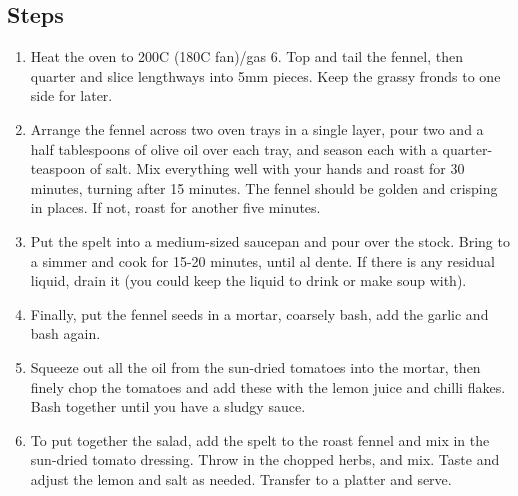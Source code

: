 \documentclass{book}
\begin{document}
\subsection*{Steps}
\begin{enumerate}
\item Heat the oven to 200C (180C fan)/gas 6. Top and tail the fennel, then quarter and slice lengthways into 5mm pieces. Keep the grassy fronds to one side for later.
\item Arrange the fennel across two oven trays in a single layer, pour two and a half tablespoons of olive oil over each tray, and season each with a quarter-teaspoon of salt. Mix everything well with your hands and roast for 30 minutes, turning after 15 minutes. The fennel should be golden and crisping in places. If not, roast for another five minutes.
\item Put the spelt into a medium-sized saucepan and pour over the stock. Bring to a simmer and cook for 15-20 minutes, until al dente. If there is any residual liquid, drain it (you could keep the liquid to drink or make soup with).
\item Finally, put the fennel seeds in a mortar, coarsely bash, add the garlic and bash again.
\item Squeeze out all the oil from the sun-dried tomatoes into the mortar, then finely chop the tomatoes and add these with the lemon juice and chilli flakes. Bash together until you have a sludgy sauce.
\item To put together the salad, add the spelt to the roast fennel and mix in the sun-dried tomato dressing. Throw in the chopped herbs, and mix. Taste and adjust the lemon and salt as needed. Transfer to a platter and serve.
\end{enumerate}
\newpage
\end{document}
